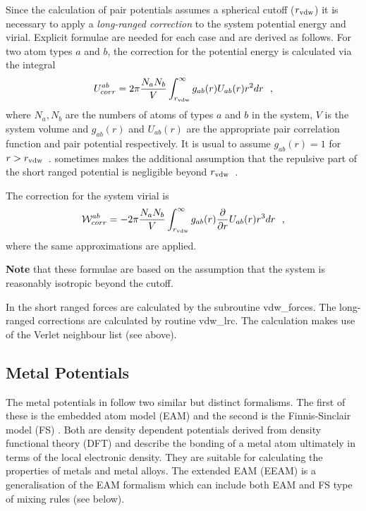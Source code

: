 Since the calculation of pair potentials assumes a spherical
cutoff ($r_{\rm vdw}$) it is necessary to apply a {\em long-ranged
correction} to the
system potential energy and virial.  Explicit formulae are needed
for each case and are derived as follows.  For two atom types $a$
and $b$, the correction for the potential energy is calculated via
the integral
\begin{equation}
U_{corr}^{ab} = 2\pi
\frac{N_{a}N_{b}}{V}\int_{r_{\rm vdw}}^{\infty}g_{ab}(r)U_{ab}(r)r^{2}dr~~,
\end{equation}
where $N_{a},N_{b}$ are the numbers of atoms of types $a$ and $b$
in the system, $V$ is the system volume and $g_{ab}(r)$ and
$U_{ab}(r)$ are the appropriate pair correlation function and pair
potential respectively.  It is usual to assume $g_{ab}(r)=1$ for
$r>r_{\rm vdw}$~.  \D sometimes makes the additional assumption that
the repulsive part of the short ranged potential is negligible
beyond $r_{\rm vdw}$~.

The correction for the system virial is
\begin{equation}
{\cal W}_{corr}^{ab} = -2\pi \frac{N_{a}N_{b}}{V}
\int_{r_{\rm vdw}}^{\infty}g_{ab}(r) \frac{\partial}{\partial
r}U_{ab}(r)r^{3}dr~~,
\end{equation}
where the same approximations are applied.

{\bf Note} that these formulae are based on the assumption that the
system is reasonably isotropic beyond the cutoff.

In \D the short ranged forces are calculated by the subroutine
{\sc vdw\_forces}.  The long-ranged corrections are calculated by
routine {\sc vdw\_lrc}.  The calculation makes use of the
Verlet neighbour list (see above).

\subsection{Metal Potentials}
\label{metal}

The metal potentials in \D follow two similar but distinct formalisms.
The first of these is the embedded atom model (EAM)
\cite{baskes-84a,baskes-86a} and the second is the Finnis-Sinclair
model (FS) \cite{finnis-84a}.  Both are density dependent potentials
derived from density functional theory (DFT) and describe the bonding
of a metal atom ultimately in terms of the local electronic density.
They are suitable for calculating the properties of metals
 and metal alloys.  The extended EAM (EEAM)
\cite{hepburn-08a,lau-07a} is a generalisation of the EAM formalism
which can include both EAM and FS type of mixing rules (see below).

